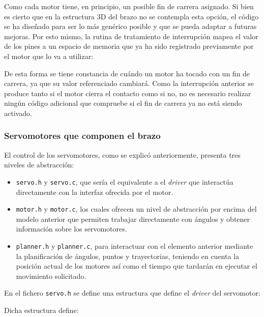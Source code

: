 Como cada motor tiene, en principio, un posible fin de carrera asignado. Si bien es
cierto que en la estructura 3D del brazo no se contempla esta opción, el código se
ha diseñado para ser lo más genérico posible y que se pueda adaptar a futuras mejoras.
Por esto mismo, la rutina de tratamiento de interrupción mapea el valor de los
pines a un espacio de memoria que ya ha sido registrado previamente por el motor
que lo va a utilizar:



De esta forma se tiene constancia de cuándo un motor ha tocado con un fin de carrera,
ya que su valor referenciado cambiará. Como la interrupción anterior se produce tanto
si el motor cierra el contacto como si no, no es necesario realizar ningún código
adicional que compruebe si el fin de carrera ya no está siendo activado.

\subsubsection{Servomotores que componen el brazo}
El control de los servomotores, como se explicó anteriormente, presenta tres niveles
de abstracción:

\begin{itemize}
    \item \texttt{servo.h} y \texttt{servo.c}, que sería el equivalente a el
    \textit{driver} que interactúa directamente con la interfaz ofrecida por el motor.
    \item \texttt{motor.h} y \texttt{motor.c}, los cuales ofrecen un nivel de abstracción
    por encima del modelo anterior que permiten trabajar directamente con ángulos y obtener
    información sobre los servomotores.
    \item \texttt{planner.h} y \texttt{planner.c}, para interactuar con el elemento anterior
    mediante la planificación de ángulos, puntos y trayectorias, teniendo en cuenta la
    posición actual de los motores así como el tiempo que tardarán en ejecutar el
    movimiento solicitado.
\end{itemize}

En el fichero \texttt{servo.h} se define una estructura que define el \textit{driver}
del servomotor:



Dicha estructura define:

